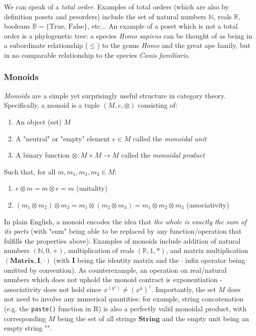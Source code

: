 \documentclass[12pt,a4paper]{article}
\begin{document}
We can speak of a \textit{total order}. Examples of total orders (which are also by definition posets and preorders) include the set of natural numbers $\mathbb{N}$, reals $\mathbb{R}$, booleans $\mathbb{B} = \{ \text{True, False} \}$, etc... An example of a poset which is not a total order is a phylogenetic tree: a species \textit{Homo sapiens} can be thought of as being in a subordinate relationship ($\leq$) to the genus \textit{Homo} and the great ape family, but in no comparable relationship to the species \textit{Canis familiaris}.

\subsubsection{Monoids}

\textit{Monoids} are a simple yet surprisingly useful structure in category theory. Specifically, a monoid is a tuple $(M, e, \otimes)$ consisting of:

\begin{enumerate}
\item An object (set) $M$
\item A "neutral" or "empty" element $e \in M$ called the \textit{monoidal unit}
\item A binary function $\otimes: M \times M \to M$ called the \textit{monoidal product}
\end{enumerate}

Such that, for all $m, m_1, m_2, m_3 \in M$: 

\begin{enumerate}
\renewcommand{\theenumi}{\alph{enumi}}
\item $e \otimes m = m \otimes e = m$ (unitality)
\item $(m_1 \otimes m_2) \otimes m_3 = m_1 \otimes (m_2 \otimes m_3) = m_1 \otimes m_2 \otimes m_3$ (associativity)
\end{enumerate}

In plain English, a monoid encodes the idea that \textit{the whole is exactly the sum of its parts} (with "sum" being able to be replaced by any function/operation that fulfills the properties above). Examples of monoids include addition of natural numbers $(\mathbb{N}, 0, +)$, multiplication of reals $(\mathbb{R}, 1, *)$, and matrix multiplication $(\mathbf{Matrix}, \mathbf{I}, \cdot)$ (with $\mathbf{I}$ being the identity matrix and the $\cdot$ infix operator being omitted by convention). As counterexample, an operation on real/natural numbers which does not uphold the monoid contract is exponentiation - associativity does not hold since $x^{(y^z)} \neq (x^y)^z$. Importantly, the set $M$ does not need to involve any numerical quantities: for example, string concatenation (e.g. the \texttt{paste()} function in R) is also a perfectly valid monoidal product, with corresponding $M$ being the set of all strings $\textbf{String}$ and the empty unit being an empty string "".
\end{document}
